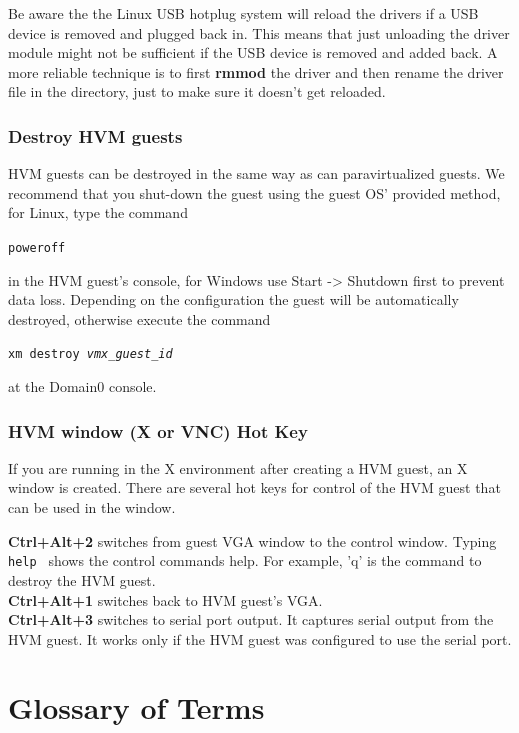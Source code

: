\documentclass[11pt,twoside,final,openright]{report}
\begin{document}
\begin{description}
Be aware the the Linux USB
hotplug system will reload
the drivers if a USB device
is removed and plugged back
in.
This means that just unloading
the driver module might not
be sufficient if the USB device
is removed and added back.
A more reliable technique is
to first
\textbf{rmmod}
the driver and then rename the
driver file in the
directory,
just to make sure it doesn't get
reloaded.
\end{description}

\subsection{Destroy HVM guests}
HVM guests can be destroyed in the same way as can paravirtualized guests. We recommend that you shut-down the guest using the guest OS' provided method, for Linux, type the command

{\small {\tt poweroff}} 

in the HVM guest's console, for Windows use Start -> Shutdown first to prevent
data loss. Depending on the configuration the guest will be automatically
destroyed, otherwise execute the command 

{\small {\tt xm destroy \emph{vmx\_guest\_id} }} 

at the Domain0 console.

\subsection{HVM window (X or VNC) Hot Key}
If you are running in the X environment after creating a HVM guest, an X window is created. There are several hot keys for control of the HVM guest that can be used in the window.
 
{\bfseries Ctrl+Alt+2} switches from guest VGA window to the control window. Typing {\small {\tt help }} shows the control commands help. For example, 'q' is the command to destroy the HVM guest.\\
{\bfseries Ctrl+Alt+1} switches back to HVM guest's VGA.\\
{\bfseries Ctrl+Alt+3} switches to serial port output. It captures serial output from the HVM guest. It works only if the HVM guest was configured to use the serial port. \\


\chapter{Glossary of Terms}
\end{document}
